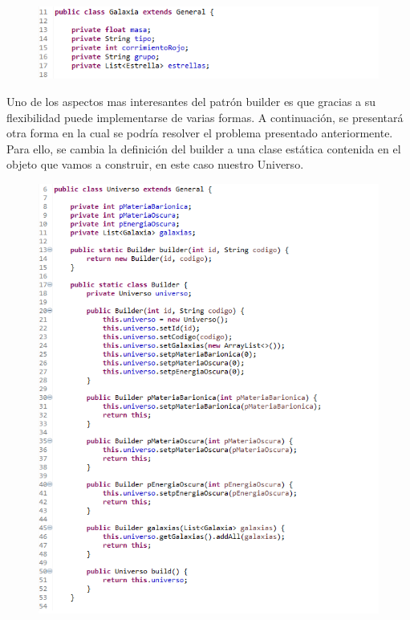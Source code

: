 \begin{figure}[H]
	\includegraphics{images/creational/builder/builderExample12.png}
\end{figure}

Uno de los aspectos mas interesantes del patrón builder es que gracias a su flexibilidad puede implementarse de varias formas. A continuación, se presentará otra forma en la cual se podría resolver el problema presentado anteriormente. Para ello, se cambia la definición del builder a una clase estática contenida en el objeto que vamos a construir, en este caso nuestro Universo.

\begin{figure}[H]
	\includegraphics{images/creational/builder/builderExample13.png}
\end{figure}

